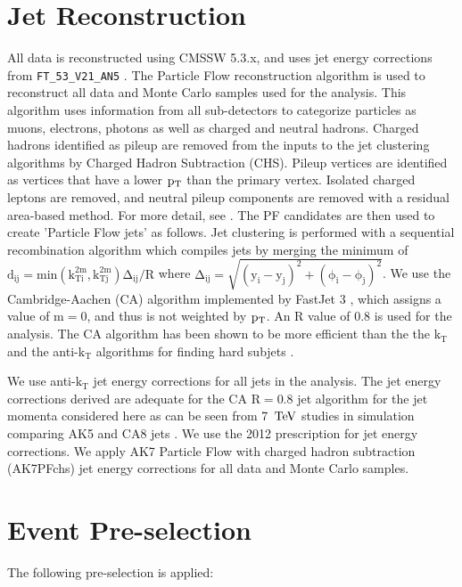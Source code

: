 \section{Jet Reconstruction}
\label{sec:reconstruction}
All data is reconstructed using CMSSW 5.3.x, and uses jet energy corrections from \verb!FT_53_V21_AN5! \cite{CMS-DP-2013-033}.  The Particle Flow reconstruction algorithm is used 
to reconstruct all data and Monte Carlo samples used for the analysis.  This algorithm uses information from all sub-detectors 
to categorize particles as muons, electrons, photons as well as charged and 
neutral hadrons.  Charged hadrons identified as pileup are removed from the inputs to the jet clustering algorithms by Charged Hadron Subtraction (CHS).
Pileup vertices are identified as vertices that have a lower $\mathrm{p_{T}}$ than the primary vertex.  Isolated charged leptons are removed,
and neutral pileup components are removed with a residual area-based method.  For more detail, see \cite{7tevZprime}.  
The PF candidates are then used to create 'Particle Flow jets' as follows.  Jet clustering is performed 
with a sequential recombination algorithm which compiles jets by merging the minimum of 
$\mathrm{d_{ij} = min(k_{Ti}^{2m},k_{Tj}^{2m})\Delta _{ij}/R}$ where $\mathrm{\Delta _{ij} = \sqrt{(y_i-y_j)^2 + (\phi _i-\phi _j)^2}}$.
  We use the Cambridge-Aachen (CA) \cite{CAcambridge,CAaachen} algorithm implemented by FastJet 3 \cite{fastjet1,fastjet2}, 
which assigns a value of $\mathrm{m = 0}$, and thus is not weighted by $\mathrm{p_{T}}$.  An R value 
of 0.8 is used for the analysis.  The CA algorithm has been shown to be more efficient than the 
the $\mathrm{k_{T}}$ and the anti-$\mathrm{k_{T}}$ algorithms for finding hard subjets \cite{catop_cms}.

We use anti-$\mathrm{k_{T}}$ jet energy corrections for all jets in the analysis. 
The jet energy corrections derived are adequate for the CA $\mathrm{R=0.8}$ jet algorithm for the jet momenta
considered here as can be seen from 7~$\mathrm{TeV}$ studies in simulation comparing AK5 and CA8 jets \cite{7tevZprime}.  
We use the 2012 prescription for jet energy corrections\cite{JEC2012}.  We apply AK7 
Particle Flow with charged hadron subtraction 
(AK7PFchs) jet energy corrections for all data and Monte Carlo samples.

\section{Event Pre-selection}
\label{sec:pre-selection}
The following pre-selection is applied:

